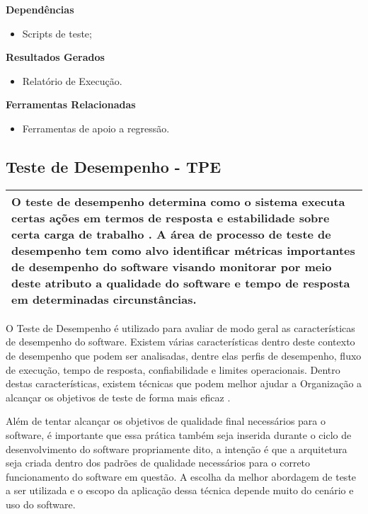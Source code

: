 \textbf{Dependências}
\begin{itemize}
    \item Scripts de teste;
\end{itemize}

\textbf{Resultados Gerados}
\begin{itemize}
    \item Relatório de Execução.
\end{itemize}

\textbf{Ferramentas Relacionadas}
\begin{itemize}
    \item Ferramentas de apoio a regressão.
\end{itemize}

\subsection{Teste de Desempenho - TPE}
\label{sec:tpe}

\begin{table}[!ht]
\centering
\begin{tabular}{|p{130mm}|}
\hline
O teste de desempenho determina como o sistema executa certas ações em termos de resposta e estabilidade sobre certa carga de trabalho \cite{Molyneaux2009}. A área de processo de teste de desempenho tem como alvo identificar métricas importantes de desempenho do software visando monitorar por meio deste atributo a qualidade do software e tempo de resposta em determinadas circunstâncias.\\
\hline
\end{tabular}
\end{table}

O Teste de Desempenho é utilizado para avaliar de modo geral as características de desempenho do software. Existem várias características dentro deste contexto de desempenho que podem ser analisadas, dentre elas perfis de desempenho, fluxo de execução, tempo de resposta, confiabilidade e limites operacionais. Dentro destas características, existem técnicas que podem melhor ajudar a Organização a alcançar os objetivos de teste de forma mais eficaz \cite{RUP940320}.

Além de tentar alcançar os objetivos de qualidade final necessários para o software, é importante que essa prática também seja inserida durante o ciclo de desenvolvimento do software propriamente dito, a intenção é que a arquitetura seja criada dentro dos padrões de qualidade necessários para o correto funcionamento do software em questão. A escolha da melhor abordagem de teste a ser utilizada e o escopo da aplicação dessa técnica depende muito do cenário e uso do software.

